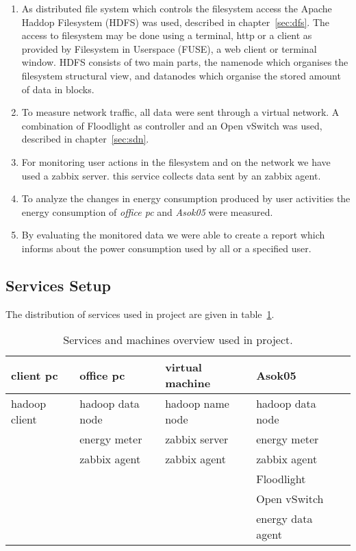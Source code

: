 \begin{enumerate}

\item As distributed file system which controls the filesystem access the Apache Haddop\textsuperscript{\textregistered} Filesystem (HDFS) was used, described in chapter~\ref{sec:dfs}. The access to filesystem may be done using a terminal, http or a client as provided by Filesystem in Userspace (FUSE), a web client or terminal window. HDFS consists of two main parts, the namenode which organises the filesystem structural view, and datanodes which organise the stored amount of data in blocks.

\item To measure network traffic, all data were sent through a virtual network. A combination of Floodlight as controller and an Open vSwitch was used, described in chapter~\ref{sec:sdn}. 

\item For monitoring user actions in the filesystem and on the network we have used a zabbix server. this service collects data sent by an zabbix agent. 

\item To analyze the changes in energy consumption produced by user activities the energy consumption of \textit{office pc} and \textit{Asok05} were measured. 

\item By evaluating the monitored data we were able to create a  report which informs about the power consumption used by all or a specified user. 

\end{enumerate}

\subsection{Services Setup}

The distribution of services used in project are given in table~\ref{tab:services}.

\begin{table}[b]
	\centering
	\caption{Services and machines overview used in project. }
	\begin{tabular}{|l|l|l|l|l|}
		\hline \rule[-2ex]{0pt}{5.5ex} \textbf{client pc} & \textbf{office pc} & \textbf{virtual machine} & \textbf{Asok05} \\ 
		\hline \rule[-2ex]{0pt}{5.5ex} hadoop client & hadoop data node & hadoop name node & hadoop data node \\ 
		       \rule[-2ex]{0pt}{5.5ex}  & energy meter & zabbix server & energy meter \\ 
		       \rule[-2ex]{0pt}{5.5ex}  & zabbix agent & zabbix agent & zabbix agent \\ 
		       \rule[-2ex]{0pt}{5.5ex}  &  &  & Floodlight \\ 
		       \rule[-2ex]{0pt}{5.5ex}  &  &  & Open vSwitch \\ 
		       \rule[-2ex]{0pt}{5.5ex}  &  &  & energy data agent \\ 
		\hline 
	\end{tabular}
	\label{tab:services}
\end{table}
